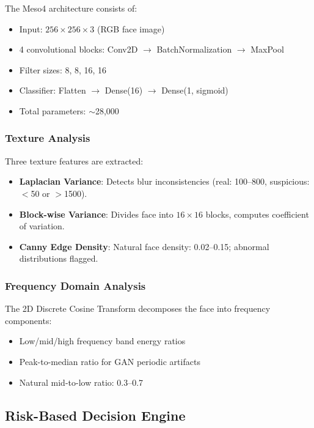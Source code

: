 \documentclass[conference,10pt]{IEEEtran}
\begin{document}
The Meso4 architecture consists of:

\begin{itemize}
    \item Input: $256 \times 256 \times 3$ (RGB face image)
    \item 4 convolutional blocks: Conv2D $\rightarrow$ BatchNormalization $\rightarrow$ MaxPool
    \item Filter sizes: 8, 8, 16, 16
    \item Classifier: Flatten $\rightarrow$ Dense(16) $\rightarrow$ Dense(1, sigmoid)
    \item Total parameters: $\sim$28,000
\end{itemize}

\subsubsection{Texture Analysis}

Three texture features are extracted:
\begin{itemize}
    \item \textbf{Laplacian Variance}: Detects blur inconsistencies (real: 100--800, suspicious: $<$50 or $>$1500).
    \item \textbf{Block-wise Variance}: Divides face into $16 \times 16$ blocks, computes coefficient of variation.
    \item \textbf{Canny Edge Density}: Natural face density: 0.02--0.15; abnormal distributions flagged.
\end{itemize}

\subsubsection{Frequency Domain Analysis}

The 2D Discrete Cosine Transform decomposes the face into frequency components:
\begin{itemize}
    \item Low/mid/high frequency band energy ratios
    \item Peak-to-median ratio for GAN periodic artifacts
    \item Natural mid-to-low ratio: 0.3--0.7
\end{itemize}

\subsection{Risk-Based Decision Engine}
\end{document}
